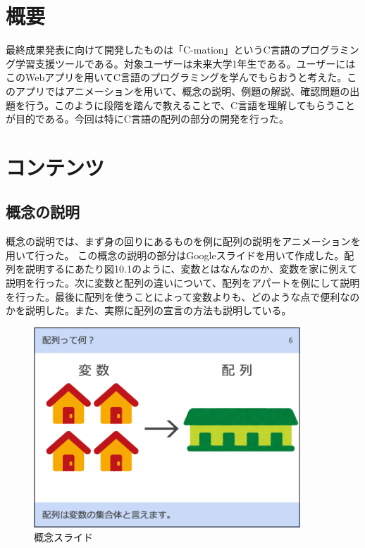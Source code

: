 \documentclass[openany,11pt,papersize]{jsbook}
\begin{document}
\section{概要}
最終成果発表に向けて開発したものは「C-mation」というC言語のプログラミング学習支援ツールである。対象ユーザーは未来大学1年生である。ユーザーにはこのWebアプリを用いてC言語のプログラミングを学んでもらおうと考えた。このアプリではアニメーションを用いて、概念の説明、例題の解説、確認問題の出題を行う。このように段階を踏んで教えることで、C言語を理解してもらうことが目的である。今回は特にC言語の配列の部分の開発を行った。

\section{コンテンツ}

\subsection{概念の説明}
概念の説明では、まず身の回りにあるものを例に配列の説明をアニメーションを用いて行った。
この概念の説明の部分はGoogleスライドを用いて作成した。配列を説明するにあたり図10.1のように、変数とはなんなのか、変数を家に例えて説明を行った。次に変数と配列の違いについて、配列をアパートを例にして説明を行った。最後に配列を使うことによって変数よりも、どのような点で便利なのかを説明した。また、実際に配列の宣言の方法も説明している。
\begin{figure}[H]
\begin{center}
\includegraphics[width=10cm, bb=0 0 850 638]{img/10thParagraph/gainen_01.png}
\end{center}
\caption{概念スライド}
\end{figure}

\end{document}
